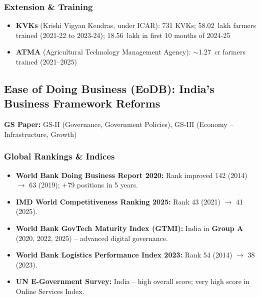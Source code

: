 \subsubsection*{Extension \& Training}
\begin{itemize}
  \item \textbf{KVKs} (Krishi Vigyan Kendras, under ICAR): 731 KVKs; 58.02~lakh farmers trained (2021-22 to 2023-24); 18.56~lakh in first 10 months of 2024-25
  \item \textbf{ATMA} (Agricultural Technology Management Agency): $\sim$1.27~cr farmers trained (2021--2025)
\end{itemize}

\subsection{Ease of Doing Business (EoDB): India's Business Framework Reforms}

\textbf{GS Paper:} GS-II (Governance, Government Policies), GS-III (Economy -- Infrastructure, Growth)

\subsubsection*{Global Rankings \& Indices}
\begin{itemize}
  \item \textbf{World Bank Doing Business Report 2020:} Rank improved 142 (2014) $\rightarrow$ 63 (2019); +79 positions in 5 years.
  \item \textbf{IMD World Competitiveness Ranking 2025:} Rank 43 (2021) $\rightarrow$ 41 (2025).
  \item \textbf{World Bank GovTech Maturity Index (GTMI):} India in \textbf{Group A} (2020, 2022, 2025) -- advanced digital governance.
  \item \textbf{World Bank Logistics Performance Index 2023:} Rank 54 (2014) $\rightarrow$ 38 (2023).
  \item \textbf{UN E-Government Survey:} India -- high overall score; very high score in Online Services Index.
\end{itemize}

